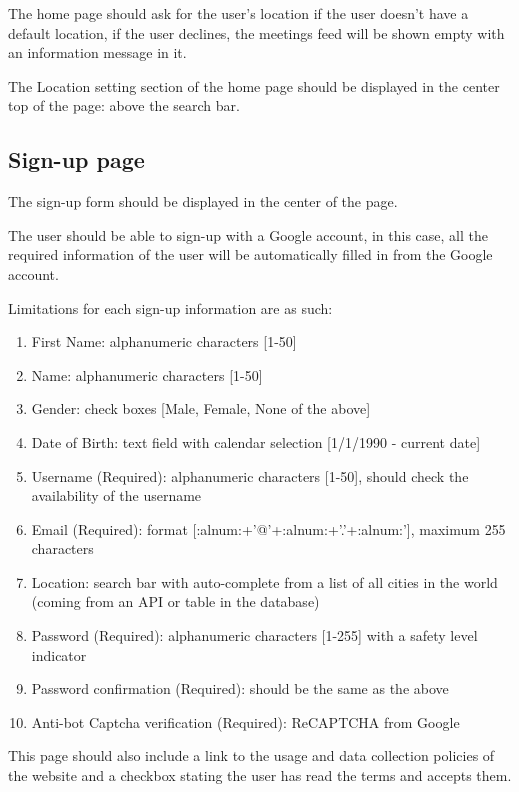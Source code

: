 \documentclass[conference]{IEEEtran}
\begin{document}
The home page should ask for the user's location if the user doesn't have a default location, if the user declines, the meetings feed will be shown empty with an information message in it.

The Location setting section of the home page should be displayed in the center top of the page: above the search bar.

\subsection{Sign-up page}

The sign-up form should be displayed in the center of the page.

The user should be able to sign-up with a Google account, in this case, all the required information of the user will be automatically filled in from the Google account.

Limitations for each sign-up information are as such:

\begin{enumerate}
    \item First Name: alphanumeric characters [1-50]
    \item Name: alphanumeric characters [1-50]
    \item Gender: check boxes [Male, Female, None of the above]
    \item Date of Birth: text field with calendar selection [1/1/1990 - current date]
    \item Username (Required): alphanumeric characters [1-50], should check the availability of the username
    \item Email (Required): format [:alnum:+'@'+:alnum:+'.'+:alnum:'], maximum 255 characters
    \item Location: search bar with auto-complete from a list of all cities in the world (coming from an API or table in the database)
    \item Password (Required): alphanumeric characters [1-255] with a safety level indicator
    \item Password confirmation (Required): should be the same as the above
    \item Anti-bot Captcha verification (Required): ReCAPTCHA from Google
\end{enumerate}

This page should also include a link to the usage and data collection policies of the website and a checkbox stating the user has read the terms and accepts them.
\end{document}
